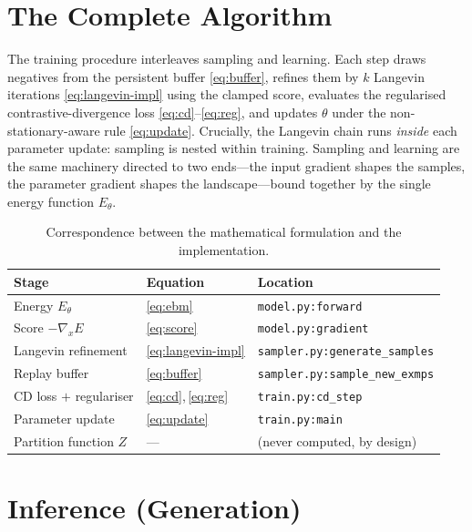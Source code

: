 \section{The Complete Algorithm}

The training procedure interleaves sampling and learning. Each step draws negatives from
the persistent buffer \eqref{eq:buffer}, refines them by $k$ Langevin iterations
\eqref{eq:langevin-impl} using the clamped score, evaluates the regularised
contrastive-divergence loss \eqref{eq:cd}--\eqref{eq:reg}, and updates $\theta$ under the
non-stationary-aware rule \eqref{eq:update}. Crucially, the Langevin chain runs \emph{inside}
each parameter update: sampling is nested within training. Sampling and learning are the
same machinery directed to two ends---the input gradient shapes the samples, the parameter
gradient shapes the landscape---bound together by the single energy function $E_\theta$.

\begin{table}[h]
\centering
\begin{tabular}{@{}lll@{}}
\toprule
Stage & Equation & Location \\
\midrule
Energy $E_\theta$            & \eqref{eq:ebm}                 & \texttt{model.py:forward} \\
Score $-\nabla_x E$          & \eqref{eq:score}               & \texttt{model.py:gradient} \\
Langevin refinement          & \eqref{eq:langevin-impl}       & \texttt{sampler.py:generate\_samples} \\
Replay buffer                & \eqref{eq:buffer}              & \texttt{sampler.py:sample\_new\_exmps} \\
CD loss $+$ regulariser      & \eqref{eq:cd},\,\eqref{eq:reg} & \texttt{train.py:cd\_step} \\
Parameter update             & \eqref{eq:update}              & \texttt{train.py:main} \\
Partition function $Z$       & ---                            & (never computed, by design) \\
\bottomrule
\end{tabular}
\caption{Correspondence between the mathematical formulation and the implementation.}
\end{table}

\section{Inference (Generation)}
\label{sec:inference}

